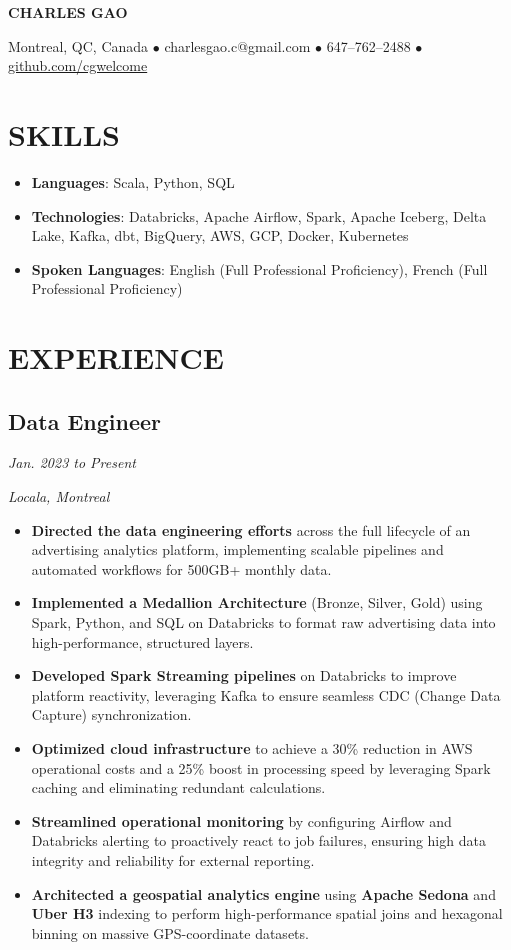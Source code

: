 \documentclass[12pt]{extarticle}
\begin{document}
\begin{center}
\textbf{\huge{CHARLES GAO}}

Montreal, QC, Canada
$\bullet$ charlesgao.c@gmail.com
$\bullet$ 647--762--2488
$\bullet$ \href{https://github.com/cgwelcome}{github.com/cgwelcome}
\end{center}

\section*{SKILLS}
\begin{itemize}
  \item \textbf{Languages}: Scala, Python, SQL
  \item \textbf{Technologies}: Databricks, Apache Airflow, Spark, Apache Iceberg, Delta Lake, Kafka, dbt, BigQuery, AWS, GCP, Docker, Kubernetes
  \item \textbf{Spoken Languages}: English (Full Professional Proficiency), French (Full Professional Proficiency)
\end{itemize}


\section*{EXPERIENCE}

\subsection*{Data Engineer} \hfill \textit{Jan. 2023 to Present}

\textit{Locala, Montreal}
\begin{itemize}
    \item \textbf{Directed the data engineering efforts} across the full lifecycle of an advertising analytics platform, implementing scalable pipelines and automated workflows for 500GB+ monthly data.
    \item \textbf{Implemented a Medallion Architecture} (Bronze, Silver, Gold) using Spark, Python, and SQL on Databricks to format raw advertising data into high-performance, structured layers.
    \item \textbf{Developed Spark Streaming pipelines} on Databricks to improve platform reactivity, leveraging Kafka to ensure seamless CDC (Change Data Capture) synchronization.
    \item \textbf{Optimized cloud infrastructure} to achieve a 30\% reduction in AWS operational costs and a 25\% boost in processing speed by leveraging Spark caching and eliminating redundant calculations.
    \item \textbf{Streamlined operational monitoring} by configuring Airflow and Databricks alerting to proactively react to job failures, ensuring high data integrity and reliability for external reporting.
    \item \textbf{Architected a geospatial analytics engine} using \textbf{Apache Sedona} and \textbf{Uber H3} indexing to perform high-performance spatial joins and hexagonal binning on massive GPS-coordinate datasets.
\end{itemize}
\end{document}

